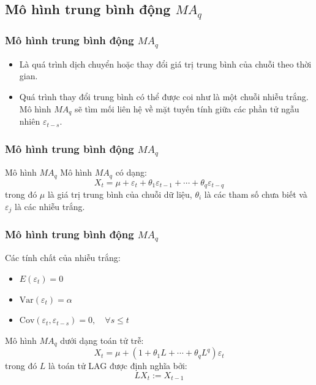 \subsection{Mô hình trung bình động $MA_q$}
\begin{frame}
\frametitle{Mô hình trung bình động $MA_q$}
\begin{itemize}
    \item Là quá trình dịch chuyển hoặc thay đổi giá trị trung bình của chuỗi theo thời gian.
\item  Quá trình thay đổi trung bình có thể được coi như là một chuỗi nhiễu trắng.
Mô hình $MA_q$ sẽ tìm mối liên hệ về mặt tuyến tính
 giữa các phần tử ngẫu nhiên $\varepsilon_{t-s}$.
\end{itemize}

\end{frame}


\begin{frame}
\frametitle{Mô hình trung bình động $MA_q$}
\begin{block}{Mô hình $MA_q$}
Mô hình $MA_q$ có dạng:
\begin{equation}
X_t = \mu + \varepsilon_t + \theta_1\varepsilon_{t-1} + \cdots + \theta_q\varepsilon_{t-q} \label{eq:104}
\end{equation}
trong đó $\mu$ là giá trị trung bình của chuỗi dữ liệu, $\theta_i$ là các tham số chưa biết và $\varepsilon_j$ là các nhiễu trắng.
\end{block}

\end{frame}

\begin{frame}
\frametitle{Mô hình trung bình động $MA_q$}
\begin{block}{Các tính chất của nhiễu trắng:}
\begin{itemize}
    \item $E(\varepsilon_t)=0$
    \item $\mathrm{Var}(\varepsilon_t)=\alpha$
    \item $\mathrm{Cov}(\varepsilon_t,\varepsilon_{t-s})=0, \quad \forall s \leq t$
    \end{itemize}
\end{block}

\pause
\begin{block}{Mô hình $MA_q$ dưới dạng toán tử trễ:}
\begin{equation}
X_t = \mu + (1+\theta_1L+\cdots+\theta_qL^q)\varepsilon_t \label{eq:108}
\end{equation}
trong đó $L$ là toán tử LAG được định nghĩa bởi:
\begin{equation}
LX_t := X_{t-1}
\end{equation}
\end{block}
\end{frame}


